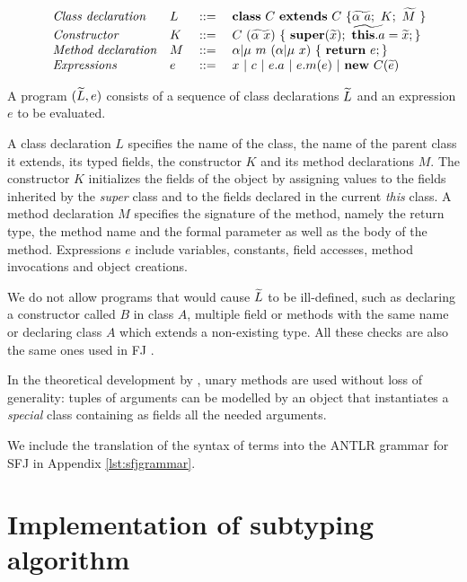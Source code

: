 \documentclass{l4proj}
\begin{document}
\begin{equation}
    \label{eq:syntaxterms}
    \begin{array}{llllll}
         & \mbox{\textit{Class declaration}}  & L & \; ::= \; & \syndecl{C}{C}{\wt{\alpha \ a};\ K; \ \wt{M}\ }                         \\
         & \mbox{\textit{Constructor}}        & K & \;::=\;   & C\ (\wt{\alpha\ x})\ \{\ \synsuper(\wt{x});\ \wt{\synthis.a}=\wt{x}; \} \\
         & \mbox{\textit{Method declaration}} & M & \; ::= \; & \alpha | \mu \ m\ (\alpha | \mu \ x)\ \{\ \synret e; \}                 \\
         & \mbox{\textit{Expressions}}        & e & \; ::=\;  & x\ |\  c\ |\ e.a\ |\ e.m(e) \ | \ \synnew C(\wt{e})
    \end{array}
\end{equation}

A program $(\widetilde{L}, e)$ consists of a sequence of class declarations $\widetilde{L}$ and an expression $e$ to be evaluated.

A class declaration $L$ specifies the name of the class, the name of the parent class it extends, its typed fields, the constructor $K$ and its method declarations $M$.
The constructor $K$ initializes the fields of the object by assigning values to the fields inherited by the \textit{super} class and to the fields declared in the current \textit{this} class.
A method declaration $M$ specifies the signature of the method, namely the return type, the method name and the formal parameter as well as the body of the method.
Expressions $e$ include variables, constants, field accesses, method invocations and object creations.

We do not allow programs that would cause $\widetilde{L}$ to be ill-defined, such as declaring a constructor called $B$ in class $A$, multiple field or methods with the same name or declaring class $A$ which extends a non-existing type.
All these checks are also the same ones used in FJ \citep{Igarashi1999}.

In the theoretical development by \citet{Dardha2017}, unary methods are used without loss of generality: tuples of arguments can be modelled by an object that instantiates a \emph{special} class containing as fields all the needed arguments.

We include the translation of the syntax of terms into the ANTLR grammar for SFJ in Appendix \ref{lst:sfjgrammar}.

\section{Implementation of subtyping algorithm}
\end{document}
